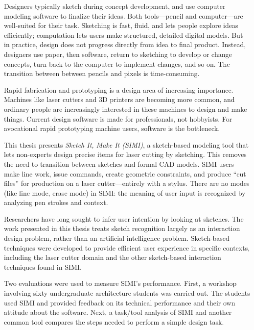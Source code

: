 Designers typically sketch during concept development, and use
computer modeling software to finalize their ideas. Both
tools---pencil and computer---are well-suited for their
task. Sketching is fast, fluid, and lets people explore ideas
efficiently; computation lets users make structured, detailed digital
models. But in practice, design does not progress directly from idea
to final product. Instead, designers use paper, then software, return
to sketching to develop or change concepts, turn back to the computer
to implement changes, and so on. The transition between between
pencils and pixels is time-consuming.

Rapid fabrication and prototyping is a design area of increasing
importance. Machines like laser cutters and 3D printers are becoming
more common, and ordinary people are increasingly interested in these
machines to design and make things. Current design software is made
for professionals, not hobbyists. For avocational rapid prototyping
machine users, software is the bottleneck.

This thesis presents \textit{Sketch It, Make It (SIMI)}, a
sketch-based modeling tool that lets non-experts design precise items
for laser cutting by sketching. This removes the need to transition
between sketches and formal CAD models. SIMI users make line work,
issue commands, create geometric constraints, and produce ``cut
files'' for production on a laser cutter---entirely with a
stylus. There are no modes (like line mode, erase mode) in SIMI: the
meaning of user input is recognized by analyzing pen strokes and
context.

Researchers have long sought to infer user intention by looking at
sketches. The work presented in this thesis treats sketch recognition
largely as an interaction design problem, rather than an artificial
intelligence problem. Sketch-based techniques were developed to
provide efficient user experience in specific contexts, including the
laser cutter domain and the other sketch-based interaction techniques
found in SIMI. 

Two evaluations were used to measure SIMI's performance. First, a
workshop involving sixty undergraduate architecture students was
carried out. The students used SIMI and provided feedback on its
technical performance and their own attitude about the software. Next,
a task/tool analysis of SIMI and another common tool compares the
steps needed to perform a simple design task.
